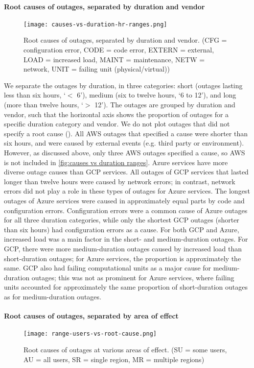\paragraph{Root causes of outages, separated by duration and vendor}
\begin{figure}
  \centering
  \texttt{[image: causes-vs-duration-hr-ranges.png]}
  \caption{Root causes of outages, separated by duration and vendor. (CFG = configuration error, CODE = code error, EXTERN = external, LOAD = increased load, MAINT = maintenance, NETW = network, UNIT = failing unit (physical/virtual))}
  \label{fig:causes vs duration ranges}
\end{figure}

We separate the outages by duration, in three categories: short (outages lasting less than six hours, `$<$ 6'), medium (six to twelve hours, `6 to 12'), and long (more than twelve hours, `$>$ 12').
The outages are grouped by duration and vendor, such that the horizontal axis shows the proportion of outages for a specific duration category and vendor.
We do not plot outages that did not specify a root cause ().
All AWS outages that specified a cause were shorter than six hours, and were caused by external events (e.g. third party or environment).
However, as discussed above, only three AWS outages specified a cause, so AWS is not included in \autoref{fig:causes vs duration ranges}.
Azure services have more diverse outage causes than GCP services.
All outages of GCP services that lasted longer than twelve hours were caused by network errors; in contrast, network errors did not play a role in these types of outages for Azure services.
The longest outages of Azure services were caused in approximately equal parts by code and configuration errors.
Configuration errors were a common cause of Azure outages for all three duration categories, while only the shortest GCP outages (shorter than six hours) had configuration errors as a cause.
For both GCP and Azure, increased load was a main factor in the short- and medium-duration outages.
For GCP, there were more medium-duration outages caused by increased load than short-duration outages; for Azure services, the proportion is approximately the same.
GCP also had failing computational units as a major cause for medium-duration outages; this was not as prominent for Azure services, where failing units accounted for approximately the same proportion of short-duration outages as for medium-duration outages.

\paragraph{Root causes of outages, separated by area of effect}
\begin{figure}
  \centering
  \texttt{[image: range-users-vs-root-cause.png]}
  \caption{Root causes of outages at various areas of effect. (SU = some users, AU = all users, SR = single region, MR = multiple regions)}
  \label{fig:causes vs aoes}
\end{figure}

